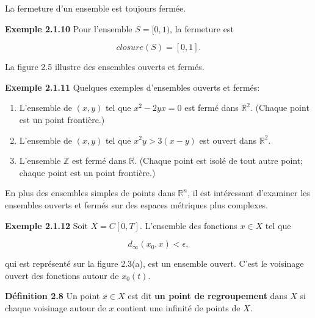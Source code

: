 \documentclass[10pt,twoside,a4paper]{book}
\begin{document}
\noindent
La fermeture d'un ensemble est toujours fermée.

\vspace{4mm}
\noindent
\textbf{Exemple 2.1.10} Pour l'ensemble $S = [0, 1)$, la fermeture est

\begin{equation*}
  closure(S) = [0, 1].
\end{equation*}


\vspace{2mm}
\noindent
La figure 2.5 illustre des ensembles ouverts et fermés.


\vspace{4mm}
\noindent
\textbf{Exemple 2.1.11} Quelques exemples d'ensembles ouverts et fermés:

\begin{enumerate}
  \item L'ensemble de $(x, y)$ tel que $x^2-2yx = 0$ est fermé dans $\mathbb{R}^2$. (Chaque point est un point frontière.)
  \item L'ensemble de $(x, y)$ tel que $x^2y > 3(x - y)$ est ouvert dans $\mathbb{R}^2$.
  \item L'ensemble $\mathbb{Z}$ est fermé dans $\mathbb{R}$. (Chaque point est isolé de tout autre point; chaque point est un point frontière.)
\end{enumerate}

\noindent
En plus des ensembles simples de points dans $\mathbb{R}^n$, il est intéressant d'examiner les ensembles ouverts et fermés sur des espaces métriques plus complexes.

\vspace{4mm}
\noindent
\textbf{Exemple 2.1.12} Soit $X = C[0, T]$. L'ensemble des fonctions $x \in X$ tel que

\begin{equation*}
  d_\infty(x_0, x) < \epsilon,
\end{equation*}

\noindent
qui est représenté sur la figure 2.3(a), est un ensemble ouvert. C'est le voisinage ouvert des fonctions autour de $x_0(t)$.

\vspace{4mm}
\noindent
\textbf{Définition 2.8} Un point $x \in X$ est dit \textbf{un point de regroupement} dans $X$ si chaque voisinage autour de $x$ contient une infinité de points de $X$.
\end{document}
